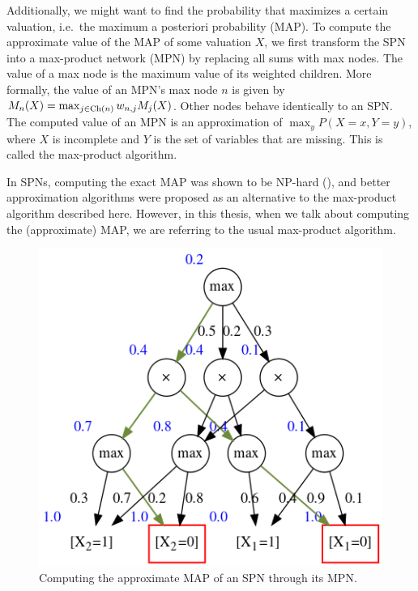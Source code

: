 Additionally, we might want to find the probability that maximizes a certain valuation, i.e.\ the
maximum a posteriori probability (MAP). To compute the approximate value of the MAP of some
valuation $X$, we first transform the SPN into a max-product network (MPN) by replacing all sums
with max nodes. The value of a max node is the maximum value of its weighted children. More
formally, the value of an MPN's max node $n$ is given by $M_n(X)=\max_{j\in\operatorname*{\text{Ch}}(n)} w_{n,j}M_j(X)$.
Other nodes behave identically to an SPN\@. The computed value of an MPN is an approximation of
$\max_y P(X=x, Y=y)$, where $X$ is incomplete and $Y$ is the set of variables that are missing.
This is called the max-product algorithm.

In SPNs, computing the exact MAP was shown to be NP-hard (\cite{theoretical-spn,cmc2017,mei2018}),
and better approximation algorithms were proposed as an alternative to the max-product algorithm
described here. However, in this thesis, when we talk about computing the (approximate) MAP, we are
referring to the usual max-product algorithm.

\begin{figure}[h]
  \centering\includegraphics[scale=0.6]{graphs/sample_mpn_prob.png}
  \caption{Computing the approximate MAP of an SPN through its MPN.\label{fig:sample_mpn_prob}}
\end{figure}


